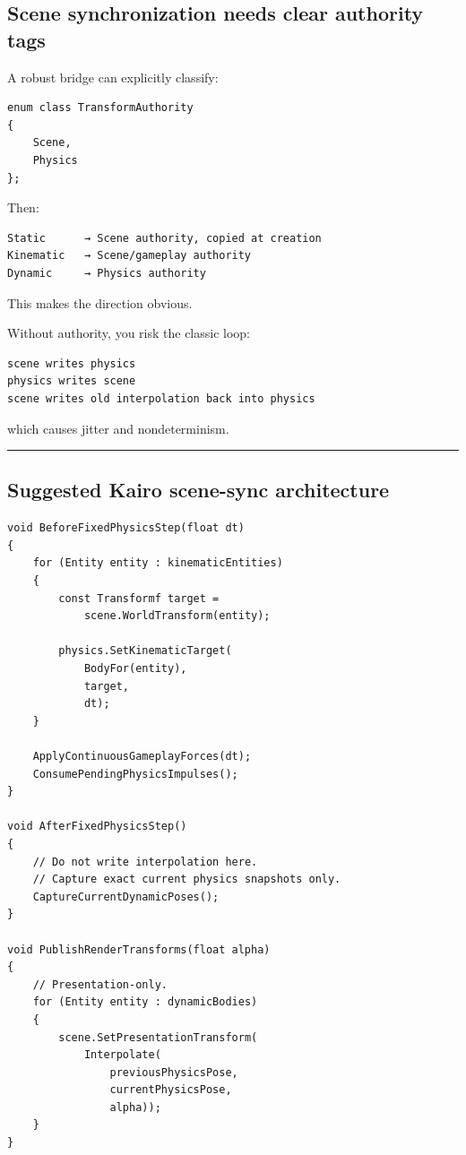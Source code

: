 \subsection{Scene synchronization needs clear authority tags}\label{06-engine-ii-ch038-scene-synchronization-needs-clear-authority-tags}

A robust bridge can explicitly classify:

\begin{verbatim}
enum class TransformAuthority
{
    Scene,
    Physics
};
\end{verbatim}

Then:

\begin{verbatim}
Static      → Scene authority, copied at creation
Kinematic   → Scene/gameplay authority
Dynamic     → Physics authority
\end{verbatim}

This makes the direction obvious.

Without authority, you risk the classic loop:

\begin{verbatim}
scene writes physics
physics writes scene
scene writes old interpolation back into physics
\end{verbatim}

which causes jitter and nondeterminism.

\begin{center}\rule{0.5\linewidth}{0.5pt}\end{center}

\subsection{Suggested Kairo scene-sync architecture}\label{06-engine-ii-ch038-suggested-kairo-scene-sync-architecture}

\begin{verbatim}
void BeforeFixedPhysicsStep(float dt)
{
    for (Entity entity : kinematicEntities)
    {
        const Transformf target =
            scene.WorldTransform(entity);

        physics.SetKinematicTarget(
            BodyFor(entity),
            target,
            dt);
    }

    ApplyContinuousGameplayForces(dt);
    ConsumePendingPhysicsImpulses();
}

void AfterFixedPhysicsStep()
{
    // Do not write interpolation here.
    // Capture exact current physics snapshots only.
    CaptureCurrentDynamicPoses();
}

void PublishRenderTransforms(float alpha)
{
    // Presentation-only.
    for (Entity entity : dynamicBodies)
    {
        scene.SetPresentationTransform(
            Interpolate(
                previousPhysicsPose,
                currentPhysicsPose,
                alpha));
    }
}
\end{verbatim}

